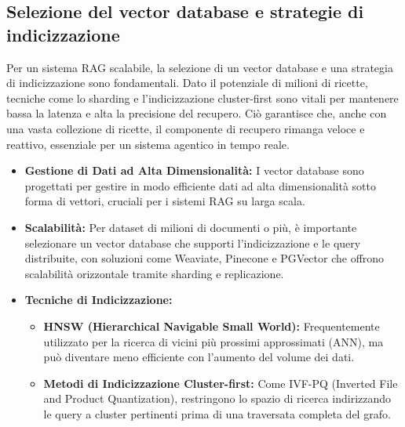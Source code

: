 \documentclass[a4paper, 11pt]{article}
\begin{document}
\subsection{Selezione del vector database e strategie di indicizzazione}
Per un sistema RAG scalabile, la selezione di un vector database e una strategia di indicizzazione sono fondamentali. Dato il potenziale di milioni di ricette, tecniche come lo sharding e l'indicizzazione cluster-first sono vitali per mantenere bassa la latenza e alta la precisione del recupero. \cite{scaling_rag_millions} Ciò garantisce che, anche con una vasta collezione di ricette, il componente di recupero rimanga veloce e reattivo, essenziale per un sistema agentico in tempo reale.
\begin{itemize}
    \item \textbf{Gestione di Dati ad Alta Dimensionalità:} I vector database sono progettati per gestire in modo efficiente dati ad alta dimensionalità sotto forma di vettori, cruciali per i sistemi RAG su larga scala. \cite{vector_databases_tutorial}
    \item \textbf{Scalabilità:} Per dataset di milioni di documenti o più, è importante selezionare un vector database che supporti l'indicizzazione e le query distribuite, con soluzioni come Weaviate, Pinecone e PGVector che offrono scalabilità orizzontale tramite sharding e replicazione. \cite{scaling_rag_millions}
    \item \textbf{Tecniche di Indicizzazione:}
    \begin{itemize}
        \item \textbf{HNSW (Hierarchical Navigable Small World):} Frequentemente utilizzato per la ricerca di vicini più prossimi approssimati (ANN), ma può diventare meno efficiente con l'aumento del volume dei dati. \cite{scaling_rag_millions}
        \item \textbf{Metodi di Indicizzazione Cluster-first:} Come IVF-PQ (Inverted File and Product Quantization), restringono lo spazio di ricerca indirizzando le query a cluster pertinenti prima di una traversata completa del grafo. \cite{scaling_rag_millions}
    \end{itemize}
\end{itemize}
\end{document}
